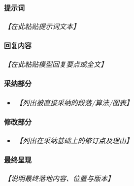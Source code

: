 \documentclass[12pt]{ctexart}
\newcommand{\ph}[1]{\textit{【#1】}}
\begin{document}
\paragraph{提示词}
\begin{flushleft}
\ph{在此粘贴提示词文本}
\end{flushleft}

\paragraph{回复内容}
\begin{flushleft}
\ph{在此粘贴模型回复要点或全文}
\end{flushleft}

\paragraph{采纳部分}
\begin{itemize}[leftmargin=1.5em]
  \item \ph{列出被直接采纳的段落/算法/图表}
\end{itemize}

\paragraph{修改部分}
\begin{itemize}[leftmargin=1.5em]
  \item \ph{列出在采纳基础上的修订点及理由}
\end{itemize}

\paragraph{最终呈现}
\begin{flushleft}
\ph{说明最终落地内容、位置与版本}
\end{flushleft}
\end{document}
